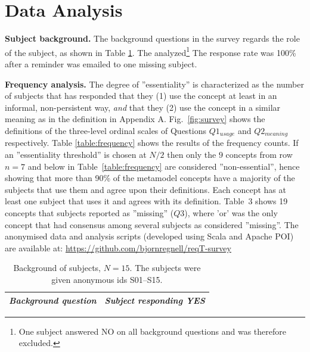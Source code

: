 \documentclass[a4paper]{llncs}
\begin{document}
\section{Data Analysis}

\textbf{Subject background.} The background questions in the survey regards the role of the subject, as shown in Table \ref{table:background}. The analyzed\footnote{One subject answered NO on all background questions and was therefore excluded.}  The response rate was 100\% after a reminder was emailed to one missing subject. %

\textbf{Frequency analysis.} The degree of ''essentiality'' is characterized as the number of subjects that has responded that they (1) use the concept at least in an informal, non-persistent way, \textit{and} that they (2) use the concept in a similar meaning as in the definition in Appendix A. Fig.~\ref{fig:survey} shows the definitions of the three-level ordinal scales of Questions $Q1_{usage}$  and $Q2_{meaning}$ respectively. Table \ref{table:frequency} shows the results of the frequency counts.  
If an ''essentiality threshold'' is chosen at $N/2$ then only the $9$ concepts from row $n = 7$ and below in Table~\ref{table:frequency} are considered ''non-essential'', hence showing that more than 90\% of the metamodel concepts have a majority of the subjects that use them and agree upon their definitions. Each concept has at least one subject that uses it and agrees with its definition. Table~3 shows 19 concepts that subjects reported as ''missing'' ($Q3$), where 'or' was the only concept that had consensus among several subjects as considered ''missing''. {The anonymised data and analysis scripts (developed using Scala and Apache POI) are available at: \footnotesize\url{https://github.com/bjornregnell/reqT-survey}} 
\vspace{-0.3cm}

\begingroup
\begin{table}[H]
\setlength{\tabcolsep}{4pt} %
\renewcommand{\arraystretch}{1.4} %
\centering
\fontsize{8.5}{9}\selectfont
\caption{Background of subjects, $N = 15$. The subjects were given anonymous ids S01--S15.}
\label{table:background}
\vspace{-0.2cm}
\begin{tabular}{p{}| p{}}
\textit{Background question} & \textit{Subject responding YES}  \\ \hline

 \end{tabular}
\end{table}
\endgroup
\end{document}
